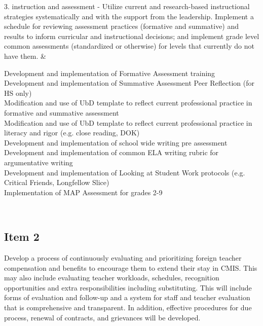 \begin{longtabu}
3.  instruction and assessment - Utilize current and research-based instructional strategies systematically and with the support from the leadership. Implement a schedule for reviewing  assessment practices (formative and summative) and results to inform curricular and instructional decisions; and implement grade level common assessments (standardized or otherwise) for levels that currently do not have them. &

\parbox[t]{2.8in}{
Development and implementation of Formative Assessment training\\
Development and implementation of Summative Assessment Peer Reflection (for HS only)\\
Modification and use of UbD template to reflect current professional practice in formative and summative assessment\\
Modification and use of UbD template to reflect current professional practice in literacy and rigor (e.g. close reading, DOK)\\
Development and implementation of school wide writing pre assessment \\
Development and implementation of common ELA writing rubric for argumentative writing\\
Development and implementation of Looking at Student Work protocols (e.g. Critical Friends, Longfellow Slice)\\
Implementation of MAP Assessment for grades 2-9 \\
}
\\
\hline
\end{longtabu}

\subsection{Item 2}

Develop a process of continuously evaluating and prioritizing foreign teacher
compensation and benefits to encourage them to extend their stay in CMIS. This may also include evaluating teacher workloads, schedules, recognition opportunities and extra responsibilities including substituting. This will include forms of evaluation and follow-up and a system for staff and teacher evaluation that is comprehensive and transparent. In addition, effective procedures for due process, renewal of contracts, and grievances will be developed.

